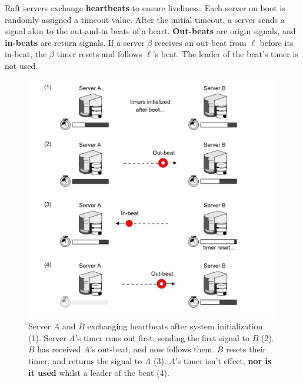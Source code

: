 \newpage 

\noindent
\begin{Def}

    Raft servers exchange \textbf{heartbeats} to ensure liveliness. Each server on boot is randomly assigned a timeout value.
    After the initial timeout, a server sends a signal akin to the out-and-in beats of a heart.
    \textbf{Out-beats} are origin signals, and \textbf{in-beats} are return signals. If a server $\beta$
    receives an out-beat from $\ell$ before its in-beat, the $\beta$ timer resets and follows $\ell$'s beat. 
    The leader of the beat's timer is not used.
\end{Def}

\vspace{-.5em}
\begin{figure}[h]
    \centering
    \includegraphics[width=.9\textwidth]{Sections/raft/heart.png}
    \caption{Server $A$ and $B$ exchanging heartbeats after system initialization (1).
    Server $A$'s timer runs out first, sending the first signal to $B$ (2). $B$ has received $A$'s out-beat, and now follows them. $B$ resets
    their timer, and returns the signal to $A$ (3).
    $A$'s timer isn't effect, \textbf{nor is it used} whilst a leader of the beat (4).}
\end{figure}

\newpage


